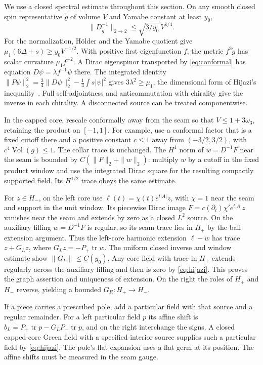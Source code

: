 \documentclass[11pt]{article}
\theoremstyle{remark}
\newcommand{\Vol}{\operatorname{Vol}}
\begin{document}
We use a closed spectral estimate throughout this section. On any smooth closed spin representative \(\widetilde g\) of volume \(V\) and Yamabe constant at least \(y_0\),
\begin{equation}
 \|D_{\widetilde g}^{-1}\|_{2\to2}\le \sqrt{3/y_0}\,V^{1/4}.
 \label{eq:hijazi}
\end{equation}
For the normalization, Hölder and the Yamabe quotient give \(\mu_1(6\Delta+s)\ge y_0V^{-1/2}\). With positive first eigenfunction \(f\), the metric \(f^2\widetilde g\) has scalar curvature \(\mu_1 f^{-2}\). A Dirac eigenspinor transported by \eqref{eq:conformal} has equation \(D\psi=\lambda f^{-1}\psi\) there. The integrated identity \(\|P\psi\|_2^2=\tfrac34\|D\psi\|_2^2-\tfrac14\int s|\psi|^2\) gives \(3\lambda^2\ge\mu_1\), the dimensional form of Hijazi's inequality~\cite[Theorem~A]{Hijazi1986Conformal}. Full self-adjointness and anticommutation with chirality give the inverse in each chirality. A disconnected source can be treated componentwise.

In the capped core, rescale conformally away from the seam so that \(V\le 1+3\omega_3\), retaining the product on \([-1,1]\). For example, use a conformal factor that is a fixed cutoff there and a positive constant \(c\le1\) away from \((-3/2,3/2)\), with \(c^4\Vol(g)\le1\). The collar trace is unchanged. The \(H^1\) norm of \(w=D^{-1}F\) near the seam is bounded by \(C(\|F\|_{2}+\|w\|_{2})\): multiply \(w\) by a cutoff in the fixed product window and use the integrated Dirac square for the resulting compactly supported field. Its \(H^{1/2}\) trace obeys the same estimate.

For \(z\in H_-\), on the left core use \(\ell(t)=\chi(t)e^{t|A|}z\), with \(\chi=1\) near the seam and support in the unit window. Its piecewise Dirac image \(F=c(\partial_t)\chi'e^{t|A|}z\) vanishes near the seam and extends by zero as a closed \(L^2\) source. On the auxiliary filling \(w=D^{-1}F\) is regular, so its seam trace lies in \(H_+\) by the ball extension argument. Thus the left-core harmonic extension \(\ell-w\) has trace \(z+G_Lz\), where \(G_Lz=-P_+\operatorname{tr}w\). The uniform closed inverse and window estimate show \(\|G_L\|\le C(y_0)\). Any core field with trace in \(H_+\) extends regularly across the auxiliary filling and then is zero by \eqref{eq:hijazi}. This proves the graph assertion and uniqueness of extension. On the right the roles of \(H_+\) and \(H_-\) reverse, yielding a bounded \(G_R:H_+\to H_-\).

If a piece carries a prescribed pole, add a particular field with that source and a regular remainder. For a left particular field \(p\) its affine shift is \(b_L=P_+\operatorname{tr}p-G_LP_-\operatorname{tr}p\), and on the right interchange the signs. A closed capped-core Green field with a specified interior source supplies such a particular field by \eqref{eq:hijazi}. The pole's flat expansion uses a flat germ at its position. The affine shifts must be measured in the seam gauge.
\end{document}
